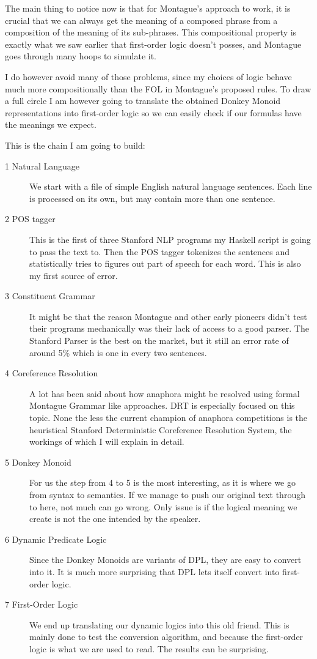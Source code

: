 \documentclass[12pt]{article}
\begin{document}
The main thing to notice now is that for Montague's approach to work, it is crucial that we can always get the meaning of a composed phrase from a composition of the meaning of its sub-phrases. This compositional property is exactly what we saw earlier that first-order logic doesn't posses, and Montague goes through many hoops to simulate it.

I do however avoid many of those problems, since my choices of logic behave much more compositionally than the FOL in Montague's proposed rules. To draw a full circle I am however going to translate the obtained Donkey Monoid representations into first-order logic so we can easily check if our formulas have the meanings we expect.

This is the chain I am going to build:

\begin{description}
\item[1 Natural Language] We start with a file of simple English natural language sentences. Each line is processed on its own, but may contain more than one sentence.

\item[2 POS tagger] This is the first of three Stanford NLP programs my Haskell script is going to pass the text to. Then the POS tagger tokenizes the sentences and statistically tries to figures out part of speech for each word. This is also my first source of error.

\item[3 Constituent Grammar] It might be that the reason Montague and other early pioneers didn't test their programs mechanically was their lack of access to a good parser. The Stanford Parser is the best on the market, but it still an error rate of around 5\% which is one in every two sentences.

\item[4 Coreference Resolution] A lot has been said about how anaphora might be resolved using formal Montague Grammar like approaches. DRT is especially focused on this topic. None the less the current champion of anaphora competitions\cite{lee2011stanford}\cite{raghunathan2010multi} is the heuristical Stanford Deterministic Coreference Resolution System, the workings of which I will explain in detail.

\item[5 Donkey Monoid] For us the step from 4 to 5 is the most interesting, as it is where we go from syntax to semantics. If we manage to push our original text through to here, not much can go wrong. Only issue is if the logical meaning we create is not the one intended by the speaker.

\item[6 Dynamic Predicate Logic] Since the Donkey Monoids are variants of DPL, they are easy to convert into it. It is much more surprising that DPL lets itself convert into first-order logic.

\item[7 First-Order Logic] We end up translating our dynamic logics into this old friend. This is mainly done to test the conversion algorithm, and because the first-order logic is what we are used to read. The results can be surprising.
\end{description}
\end{document}
